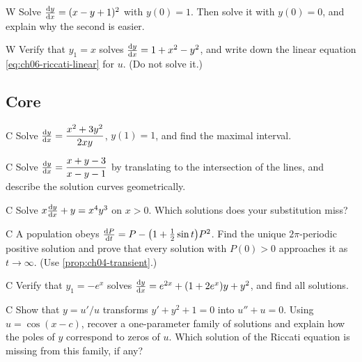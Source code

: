 \begin{problem}{W}\label{prob:ch06-w4}
Solve $\frac{\mathrm{d}y}{\mathrm{d}x} = (x - y + 1)^2$ with $y(0) = 1$. Then solve it with
$y(0) = 0$, and explain why the second is easier.
\end{problem}

\begin{problem}{W}\label{prob:ch06-w5}
Verify that $y_1 = x$ solves $\frac{\mathrm{d}y}{\mathrm{d}x} = 1 + x^2 - y^2$, and write down the
linear equation \eqref{eq:ch06-riccati-linear} for $u$. (Do not solve it.)
\end{problem}

\subsection*{Core}

\begin{problem}{C}\label{prob:ch06-c1}
Solve $\frac{\mathrm{d}y}{\mathrm{d}x} = \dfrac{x^2 + 3y^2}{2xy}$, $y(1) = 1$, and find the maximal
interval.
\end{problem}

\begin{problem}{C}\label{prob:ch06-c2}
Solve $\frac{\mathrm{d}y}{\mathrm{d}x} = \dfrac{x + y - 3}{x - y - 1}$ by translating to the
intersection of the lines, and describe the solution curves geometrically.
\end{problem}

\begin{problem}{C}\label{prob:ch06-c3}
Solve $x\frac{\mathrm{d}y}{\mathrm{d}x} + y = x^4y^3$ on $x>0$. Which solutions does your
substitution miss?
\end{problem}

\begin{problem}{C}\label{prob:ch06-c4}
A population obeys $\frac{\mathrm{d}P}{\mathrm{d}t} = P - \bigl(1 + \tfrac12\sin t\bigr)P^2$. Find the
unique $2\pi$-periodic positive solution and prove that every solution with
$P(0)>0$ approaches it as $t\to\infty$. (Use \cref{prop:ch04-transient}.)
\end{problem}

\begin{problem}{C}\label{prob:ch06-c5}
Verify that $y_1 = -e^x$ solves
$\frac{\mathrm{d}y}{\mathrm{d}x} = e^{2x} + (1 + 2e^x)y + y^2$, and find all solutions.
\end{problem}

\begin{problem}{C}\label{prob:ch06-c6}
 Show that
$y = u'/u$ transforms $y' + y^2 + 1 = 0$ into $u'' + u = 0$. Using
$u = \cos(x - c)$, recover a one-parameter family of solutions and explain how
the poles of $y$ correspond to zeros of $u$. Which solution of the Riccati
equation is missing from this family, if any?
\end{problem}

